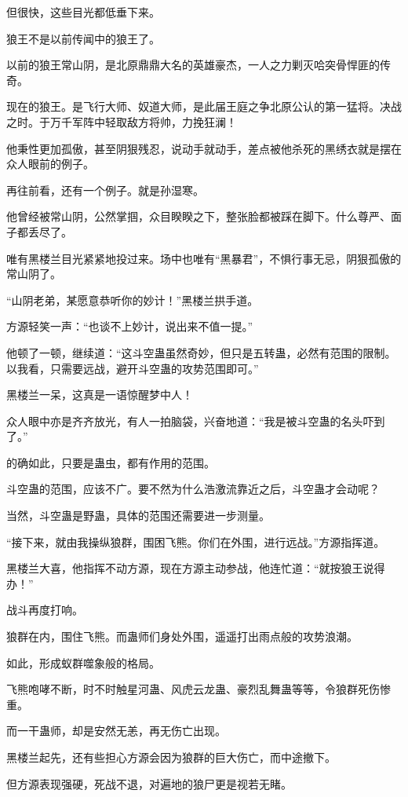 \begin{this_body}
但很快，这些目光都低垂下来。

狼王不是以前传闻中的狼王了。

以前的狼王常山阴，是北原鼎鼎大名的英雄豪杰，一人之力剿灭哈突骨悍匪的传奇。

现在的狼王。是飞行大师、奴道大师，是此届王庭之争北原公认的第一猛将。决战之时。于万千军阵中轻取敌方将帅，力挽狂澜！

他秉性更加孤傲，甚至阴狠残忍，说动手就动手，差点被他杀死的黑绣衣就是摆在众人眼前的例子。

再往前看，还有一个例子。就是孙湿寒。

他曾经被常山阴，公然掌掴，众目睽睽之下，整张脸都被踩在脚下。什么尊严、面子都丢尽了。

唯有黑楼兰目光紧紧地投过来。场中也唯有“黑暴君”，不惧行事无忌，阴狠孤傲的常山阴了。

“山阴老弟，某愿意恭听你的妙计！”黑楼兰拱手道。

方源轻笑一声：“也谈不上妙计，说出来不值一提。”

他顿了一顿，继续道：“这斗空蛊虽然奇妙，但只是五转蛊，必然有范围的限制。以我看，只需要远战，避开斗空蛊的攻势范围即可。”

黑楼兰一呆，这真是一语惊醒梦中人！

众人眼中亦是齐齐放光，有人一拍脑袋，兴奋地道：“我是被斗空蛊的名头吓到了。”

的确如此，只要是蛊虫，都有作用的范围。

斗空蛊的范围，应该不广。要不然为什么浩激流靠近之后，斗空蛊才会动呢？

当然，斗空蛊是野蛊，具体的范围还需要进一步测量。

“接下来，就由我操纵狼群，围困飞熊。你们在外围，进行远战。”方源指挥道。

黑楼兰大喜，他指挥不动方源，现在方源主动参战，他连忙道：“就按狼王说得办！”

战斗再度打响。

狼群在内，围住飞熊。而蛊师们身处外围，遥遥打出雨点般的攻势浪潮。

如此，形成蚁群噬象般的格局。

飞熊咆哮不断，时不时触星河蛊、风虎云龙蛊、豪烈乱舞蛊等等，令狼群死伤惨重。

而一干蛊师，却是安然无恙，再无伤亡出现。

黑楼兰起先，还有些担心方源会因为狼群的巨大伤亡，而中途撤下。

但方源表现强硬，死战不退，对遍地的狼尸更是视若无睹。


\end{this_body}
